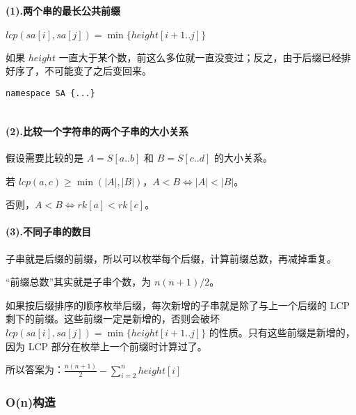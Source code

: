 \documentclass[]{article}
\let\oldparagraph\paragraph
\renewcommand{\paragraph}[1]{\oldparagraph{#1}\mbox{}}
\begin{document}
\hypertarget{ux4e24ux4e2aux4e32ux7684ux6700ux957fux516cux5171ux524dux7f00}{%
\paragraph{(1).两个串的最长公共前缀}\label{ux4e24ux4e2aux4e32ux7684ux6700ux957fux516cux5171ux524dux7f00}}

\(lcp(sa[i],sa[j])=\min\{height[i+1..j]\}\)

如果 \(height\)
一直大于某个数，前这么多位就一直没变过；反之，由于后缀已经排好序了，不可能变了之后变回来。

\begin{verbatim}
namespace SA {...}


\end{verbatim}

\hypertarget{ux6bd4ux8f83ux4e00ux4e2aux5b57ux7b26ux4e32ux7684ux4e24ux4e2aux5b50ux4e32ux7684ux5927ux5c0fux5173ux7cfb}{%
\paragraph{(2).比较一个字符串的两个子串的大小关系}\label{ux6bd4ux8f83ux4e00ux4e2aux5b57ux7b26ux4e32ux7684ux4e24ux4e2aux5b50ux4e32ux7684ux5927ux5c0fux5173ux7cfb}}

假设需要比较的是 \(A=S[a..b]\) 和 \(B=S[c..d]\) 的大小关系。

若 \(lcp(a, c)\ge\min(|A|, |B|)\)，\(A<B\iff |A|<|B|\)。

否则，\(A<B\iff rk[a]< rk[c]\)。

\hypertarget{ux4e0dux540cux5b50ux4e32ux7684ux6570ux76ee}{%
\paragraph{(3).不同子串的数目}\label{ux4e0dux540cux5b50ux4e32ux7684ux6570ux76ee}}

子串就是后缀的前缀，所以可以枚举每个后缀，计算前缀总数，再减掉重复。

``前缀总数''其实就是子串个数，为 \(n(n+1)/2\)。

如果按后缀排序的顺序枚举后缀，每次新增的子串就是除了与上一个后缀的 LCP
剩下的前缀。这些前缀一定是新增的，否则会破坏
\(lcp(sa[i],sa[j])=\min\{height[i+1..j]\}\)
的性质。只有这些前缀是新增的，因为 LCP 部分在枚举上一个前缀时计算过了。

所以答案为：\(\frac{n(n+1)}{2}-\sum\limits_{i=2}^nheight[i]\)

\hypertarget{onux6784ux9020}{%
\subsubsection{O(n)构造}\label{onux6784ux9020}}
\end{document}
